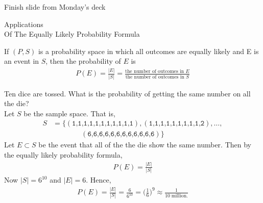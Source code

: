 \documentclass[10pt]{beamer}
\begin{document}
\begin{frame}[standout]
Finish slide from Monday's deck
\end{frame}

\begin{frame}[standout]
Applications \\
Of The Equally Likely Probability Formula
\end{frame}


\begin{frame}
\begin{mygreenbox}[title=\text{Reminder of Proposition: Equally Likely Probability Formula}]
If $(P,S)$ is a probability space in which all outcomes are equally likely and E is an event in $S$, then the probability of $E$ is
%
\begin{align*}
P(E) = \frac{|E|}{|S|} = \frac{\text{the number of outcomes in } E }{\text{the number of outcomes in } S}	
\end{align*}
\end{mygreenbox}
\end{frame}



\begin{frame}
\begin{mybluebox}[title=\text{Example: Ten Dice}]
Ten dice are tossed.  What is the probability of getting the same number on all the die? \\

%
Let $S$ be the sample space.  That is,
\begin{align*}
 S&=\bigg\{(\texttt{1,1,1,1,1,1,1,1,1,1,1}), (\texttt{1,1,1,1,1,1,1,1,1,2}), \hdots,  \\
 & \qquad \qquad (\texttt{6,6,6,6,6,6,6,6,6,6,6,6})\bigg\}
\end{align*}
%
Let $E \subset S$ be the event that all of the the die show the same number.
%
Then by the equally likely probability formula,
\begin{align*}
P(E) = 	\frac{|E|}{|S|}
\end{align*}
%
Now $|S|=6^{10}$ and $|E|=6$.
Hence,
%
\begin{align*}
P(E) = 	\frac{|E|}{|S|} = \frac{6}{6^{10}} = \bigg(\frac{1}{6}\bigg)^{9} \approx \frac{1}{10 \; \text{million}.}
\end{align*}
\end{mybluebox}

\end{frame}
\end{document}
